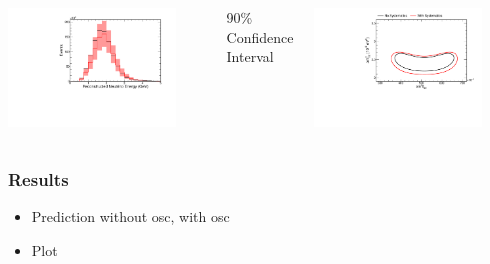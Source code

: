 \documentclass[10pt,professionalfonts,xcolor=table]{beamer}
\begin{document}
\begin{frame}
\begin{columns}[t]
\includegraphics[angle=-90, width=0.85\textwidth]{figures/systs/prediction/nd_mc_prediction_full_syst.pdf}

\vspace{15pt}
\textcolor{custom_red}{90\% Confidence Interval}
\vspace{-10pt}

\includegraphics[angle=-90, width=0.85\textwidth]{figures/systs/prediction/fd_extrap_contour_full_syst.pdf}


\end{columns}


\end{frame}


\begin{frame}
\frametitle{Results}
\begin{itemize}
\item Prediction without osc, with osc
\item Plot
\end{itemize}
\end{frame}
\end{document}

